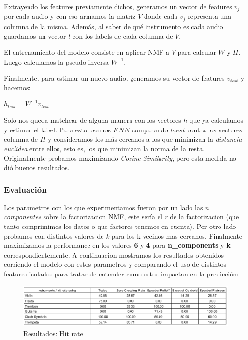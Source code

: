 Extrayendo los features previamente dichos, generamos un vector de features $v_j$ por cada audio y con eso armamos la matriz $V$ donde cada $v_j$ representa una columna de la misma. Además, al saber de qué instrumento es cada audio guardamos un vector $l$ con los labels de cada columna de $V$.

El entrenamiento del modelo consiste en aplicar NMF a $V$ para calcular $W$ y $H$. Luego calculamos la pseudo inversa $W^{-1}$.

Finalmente, para estimar un nuevo audio, generamos su vector de features $v_{test}$ y hacemos:

\begin{center}
    $h_{test} = W^{-1} v_{test}$
\end{center}

Solo nos queda matchear de alguna manera con los vectores $h$ que ya calculamos y estimar el label. Para esto usamos $KNN$ comparando $h_test$ contra los vectores columna de $H$ y consideramos los más cercanos a los que minimizan la \textit{distancia euclidea} entre ellos, esto es, los que minimizan la norma de la resta. Originalmente probamos maximizando \textit{Cosine Similarity}, pero esta medida no di\'o buenos resultados. 
    
\subsubsection{Evaluaci\'on}

Los parametros con los que experimentamos fueron por un lado las \textit{n componentes} sobre la factorizacion NMF, este ser\'ia el \textit{r} de la factorizacion (que tanto comprimimos los datos o que factores tenemos en cuenta). Por otro lado probamos con distintos valores de \textit{k} para los k vecinos mas cercanos. Finalmente maximizamos la performance en los valores \textbf{6} y \textbf{4} para \textbf{n\_components} y \textbf{k} correspondientemente. A continuacion mostramos los resultados obtenidos corriendo el modelo con estos parametros y comparando el uso de distintos features isolados para tratar de entender como estos impactan en la predicci\'on:

\begin{figure}[h!]
    \centering
    \includegraphics[scale=0.5]{Content/Figures/Comparacion_Features_Intrumentos.png}
    \caption{Resultados: Hit rate}
    \label{fig:resultados}
\end{figure}

